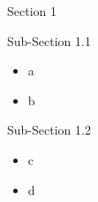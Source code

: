 \documentclass{beamer}
\begin{document}
\begin{frame}[allowframebreaks]{Section 1}
\begin{block}{Sub-Section 1.1}
\begin{itemize}
\item a
\item b
\end{itemize}
\end{block}

\begin{block}{Sub-Section 1.2}
\begin{itemize}
\item c
\item d
\end{itemize}
\end{block}

\end{frame} 
\end{document}
